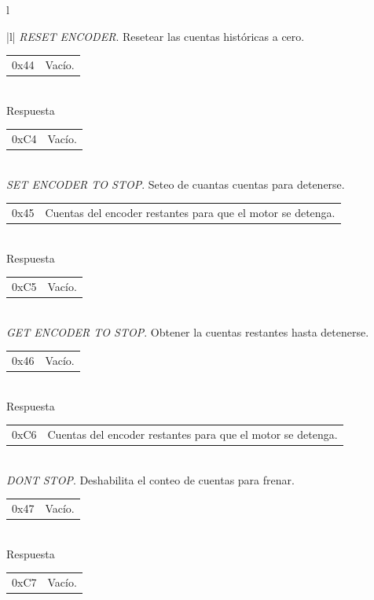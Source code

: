 \begin{table}
\begin{center}
\begin{tabular}{l}
\begin{tabular}{|l|}
				\hline\hline
				\emph{RESET ENCODER}. Resetear las cuentas hist\'oricas a cero. \\
				\hline
				\begin{tabular}{c|l}
					0x44 & Vac\'io. \\
				\end{tabular}
				\\
				\hline
				Respuesta \\
				\hline
				\begin{tabular}{c|l}
					0xC4 & Vac\'io. \\
				\end{tabular}
				\\
	
				\hline\hline
				\emph{SET ENCODER TO STOP}. Seteo de cuantas cuentas para detenerse. \\
				\hline
				\begin{tabular}{c|l}
					0x45 & Cuentas del encoder restantes para que el motor se detenga. \\
				\end{tabular}
				\\
				\hline
				Respuesta \\
				\hline
				\begin{tabular}{c|l}
					0xC5 & Vac\'io. \\
				\end{tabular}
				\\
	
				\hline\hline
				\emph{GET ENCODER TO STOP}. Obtener la cuentas restantes hasta detenerse. \\
				\hline
				\begin{tabular}{c|l}
					0x46 & Vac\'io.\\
				\end{tabular}
				\\
				\hline
				Respuesta \\
				\hline
				\begin{tabular}{c|l}
					0xC6 & Cuentas del encoder restantes para que el motor se detenga. \\
				\end{tabular}
				\\
	
				\hline\hline
				\emph{DONT STOP}. Deshabilita el conteo de cuentas para frenar. \\
				\hline
				\begin{tabular}{c|l}
					0x47 & Vac\'io.\\
				\end{tabular}
				\\
				\hline
				Respuesta \\
				\hline
				\begin{tabular}{c|l}
					0xC7 & Vac\'io. \\
				\end{tabular}
				\\
	

\end{tabular}
\end{tabular}
\end{center}
\end{table}
